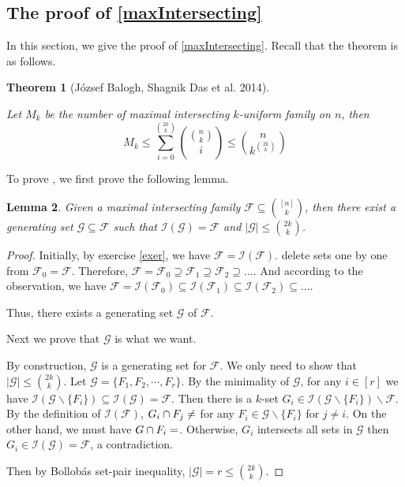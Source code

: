 \documentclass{article}
\newtheorem{theorem}{Theorem}[section]
\newtheorem{lemma}[theorem]{Lemma}
\theoremstyle{definition}
\begin{document}
\subsection{The proof of \cref{maxIntersecting}}
In this section, we give the proof of \cref{maxIntersecting}. Recall that the theorem is as follows.
\begin{theorem}[J\'ozsef Balogh, Shagnik Das et al.\cite{balogh2015intersecting} 2014]\label{mttt}

Let $M_k$ be the number of maximal intersecting $k$-uniform family on $n$, then 
$$M_k\le \underset{i=0}{\overset{\binom{2k}{k}}{\sum}}{\binom{\binom{n}{k}}{i}}\le \binom{n}{k^{\binom{2k}{k}}}$$
\end{theorem}

To prove , we first prove the following lemma.
\begin{lemma}\label{imttt}
    Given a maximal intersecting family $\mathcal{F}\subseteq \binom{[n]}{k}$, then there exist a generating set $\mathcal{G}\subseteq \mathcal{F}$ such that $\mathcal{I}(\mathcal{G})=\mathcal{F}$ and $|\mathcal{G}|\leq \binom{2k}{k}$.
\end{lemma}
\begin{proof}
   Initially, by exercise \ref{exer}, we have $\mathcal{F} =\mathcal{I}(\mathcal{F})$.
    delete sets one by one from $\mathcal{F}_0=\mathcal{F}$. Therefore, $\mathcal{F}= \mathcal{F}_0\supseteq\mathcal{F}_1\supseteq\mathcal{F}_2\supseteq...$. And according to the observation, we have $\mathcal{F}=\mathcal{I}(\mathcal{F}_0)\subseteq\mathcal{I}(\mathcal{F}_1)\subseteq\mathcal{I}(\mathcal{F}_2)\subseteq ...$.\par 
    Thus, there exists a generating set $\mathcal{G}$ of $\mathcal{F}$.\par
    Next we prove that $\mathcal{G}$ is what we want.\par
    By construction, $\mathcal{G}$ is a generating set for $\mathcal{F}$. We only need to show that $|\mathcal{G}|\leq \binom{2k}{k}$.
    Let $\mathcal{G}=\{F_1,F_2,\cdots,F_r\}$. By the minimality of $\mathcal{G}$, for any $i\in [r]$ we have $\mathcal{I}(\mathcal{G}\backslash \{F_i\})\subseteq \mathcal{I}(\mathcal{G})=\mathcal{F}$. Then there is a $k$-set $G_i\in \mathcal{I}(\mathcal{G}\backslash \{F_i\})\backslash\mathcal{F}$. By the definition of $\mathcal{I}(\mathcal{F})$, $G_i\cap F_j \neq \empty$ for any $F_i\in \mathcal{G}\backslash \{F_i\}$ for $j\neq i$. On the other hand, we must have $G\cap F_i=\empty$. Otherwise, $G_i$ intersects all sets in $\mathcal{G}$ then $G_i\in \mathcal{I}(\mathcal{G})=\mathcal{F}$, a contradiction. \par
    Then by Bollob\'as set-pair inequality, $|\mathcal{G}|=r\leq \binom{2k}{k}$.
\end{proof}
\end{document}
